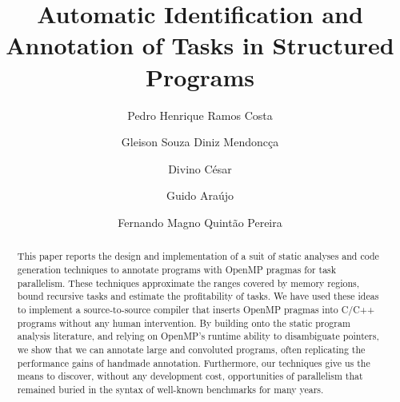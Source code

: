 \documentclass[sigplan,10pt,review,anonymous]{acmart}
\begin{document}
\title[Automatic Identification and Annotation of Tasks in Structured
Programs]
{Automatic Identification and Annotation of Tasks in Structured Programs}

\author{Pedro Henrique Ramos Costa}

\author{Gleison Souza Diniz Mendonc\c{c}a}

\author{Divino C\'{e}sar}

\author{Guido Ara\'{u}jo}

\author{Fernando Magno Quint\~{a}o Pereira}

\begin{abstract}
This paper reports the design and implementation of a suit of static analyses
and code generation techniques to annotate programs with OpenMP pragmas for
task parallelism.
These techniques approximate the ranges covered by memory regions, bound
recursive tasks and estimate the profitability of tasks.
We have used these ideas to implement a source-to-source compiler that inserts 
OpenMP pragmas into C/C++ programs without any human intervention.
By building onto the static program analysis literature, and relying on OpenMP's
runtime ability to disambiguate pointers, we show that we can annotate large and
convoluted programs, often replicating the performance gains of handmade
annotation.
Furthermore, our techniques give us the means to discover, without any 
development cost, opportunities of parallelism that remained buried in the syntax 
of well-known benchmarks for many years.
\end{abstract}
\end{document}
